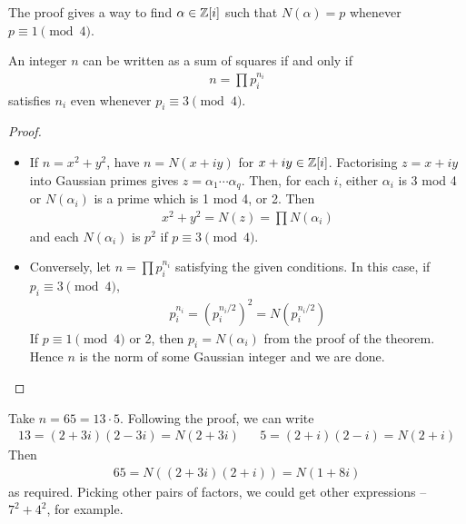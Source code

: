 \documentclass{../template/note}
\begin{document}
    \begin{remark*}
        The proof gives a way to find $\alpha \in \mathbb Z[i]$ such that $N(\alpha) = p$ whenever $p \equiv 1 \pmod 4$.
    \end{remark*}
    
    \begin{corollary}
        An integer $n$ can be written as a sum of squares if and only if
        \begin{align*}
            n = \prod p_i^{n_i}
        \end{align*}
        satisfies $n_i$ even whenever $p_i \equiv 3 \pmod 4$.        
    \end{corollary}
    
    \begin{proof}
        \begin{itemize}
            \item[$\implies$] If $n=x^2+y^2$, have $n=N(x+iy)$ for $x+iy \in \mathbb Z[i]$. Factorising $z = x+iy$ into Gaussian primes gives $z = \alpha_1 \cdots \alpha_q$. Then, for each $i$, either $\alpha_i$ is 3 mod 4 or $N(\alpha_i)$ is a prime which is 1 mod 4, or 2. Then
            \begin{align*}
                x^2+y^2 = N(z) = \prod N(\alpha_i)
            \end{align*}
            and each $N(\alpha_i)$ is $p^2$ if $p \equiv 3 \pmod 4$.
            \item[$\impliedby$] Conversely, let $n = \prod p_i^{n_i}$ satisfying the given conditions. In this case, if $p_i \equiv 3 \pmod 4$,
            \begin{align*}
                p_i^{n_i} = \left(p_i^{n_i/2}\right)^2 = N(p_i^{n_i/2})
            \end{align*}
            If $p \equiv 1 \pmod 4$ or 2, then $p_i = N(\alpha_i)$ from the proof of the theorem. Hence $n$ is the norm of some Gaussian integer and we are done.                        
        \end{itemize}
    \end{proof}
    
    \begin{example*}
        Take $n = 65 = 13\cdot 5$. Following the proof, we can write
        \begin{align*}
            13 = (2+3i)(2-3i) = N(2+3i) && 5 = (2+i)(2-i) = N(2+i)
        \end{align*}
        Then
        \begin{align*}
            65 = N\left((2+3i)(2+i)\right) = N(1+8i)
        \end{align*}
        as required. Picking other pairs of factors, we could get other expressions -- $7^2+4^2$, for example.       
    \end{example*}
    
\end{document}

